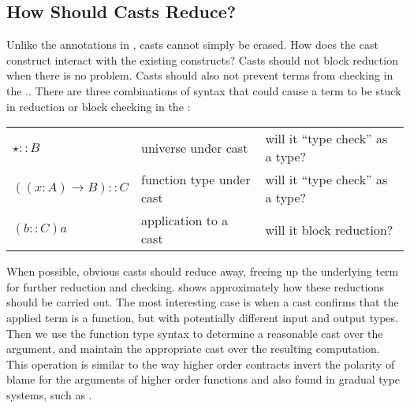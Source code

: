\subsection{How Should Casts Reduce?}

Unlike the annotations in , casts cannot simply be erased. 
How does the cast construct interact with the existing constructs?
Casts should not block reduction when there is no problem.
Casts should also not prevent terms from checking in the \csys{}..
There are three combinations of syntax that could cause a term to be stuck in reduction or block checking in the \csys{}:

\begin{tabular}{lll}
$\star::B$ & universe under cast & will it ``type check'' as a type?\tabularnewline
$\left(\left(x:A\right)\rightarrow B\right)::C$ & function type under cast & will it ``type check'' as a type?\tabularnewline
$\left(b::C\right)a$ & application to a cast & will it block reduction?\tabularnewline
\end{tabular}

When possible, obvious casts should reduce away, freeing up the underlying term for further reduction and checking.
 shows approximately how these reductions should be carried out.
The most interesting case is when a cast confirms that the applied term is a function, but with potentially different input and output types.
Then we use the function type syntax to determine a reasonable cast over the argument, and maintain the appropriate cast over the resulting computation.
This operation is similar to the way higher order contracts invert the polarity of blame for the arguments of higher order functions \cite{10.1145/581478.581484} and also found in gradual type systems, such as \cite{10.1007/978-3-642-00590-9_1}.

